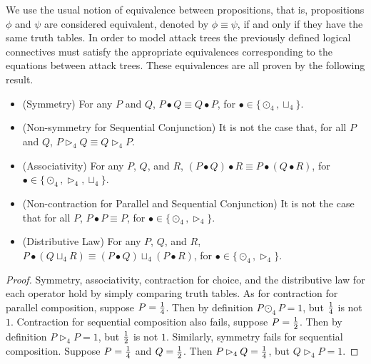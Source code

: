 We use the usual notion of equivalence between propositions, that is,
propositions $\phi$ and $\psi$ are considered equivalent, denoted by
$\phi \equiv \psi$, if and only if they have the same truth tables. In
order to model attack trees the previously defined logical connectives
must satisfy the appropriate equivalences corresponding to the
equations between attack trees.  These equivalences are all proven by
the following result.
\begin{lemma}
  \label{lemma:props_atree_ops_quaternary-semantics}
  \begin{itemize}
  \item[] (Symmetry) For any $P$ and $Q$, $P \bullet Q \equiv Q \bullet P$, for $\bullet \in \{\odot_4, \sqcup_4\}$.\\[-5px]
  \item[] (Non-symmetry for Sequential Conjunction) It is not the case that, for all $P$ and $Q$, $P \rhd_4 Q \equiv Q \rhd_4 P$.\\[-5px]
  \item[] (Associativity) For any $P$, $Q$, and $R$, $(P \bullet Q) \bullet R \equiv P \bullet (Q \bullet R)$, for $\bullet \in \{\odot_4, \rhd_4, \sqcup_4\}$.\\[-5px]
  \item[] (Non-contraction for Parallel and Sequential Conjunction) It is not the case that for all $P$, $P \bullet P \equiv P$, for $\bullet \in \{\odot_4, \rhd_4\}$.\\[-5px]
  \item[] (Distributive Law) For any $P$, $Q$, and $R$, $P \bullet (Q \sqcup_4 R) \equiv (P \bullet Q) \sqcup_4 (P \bullet R)$, for $\bullet \in \{\odot_4, \rhd_4\}$.\\[-5px]
  \end{itemize}
\end{lemma}
\begin{proof}
  Symmetry, associativity, contraction for choice, and the
  distributive law for each operator hold by simply comparing truth
  tables.  As for contraction for parallel composition, suppose $P =
  \frac{1}{4}$.  Then by definition $P \odot_4 P = 1$, but $\frac{1}{4}$ is not
  $1$.  Contraction for sequential composition also fails, suppose $P
  = \frac{1}{2}$.  Then by definition $P \rhd_4 P = 1$, but $\frac{1}{2}$ is not
  $1$.  Similarly, symmetry fails for sequential composition. Suppose
  $P = \frac{1}{4}$ and $Q = \frac{1}{2}$.  Then $P \rhd_4 Q = \frac{1}{4}$, but $Q
  \rhd_4 P = 1$.
\end{proof}

